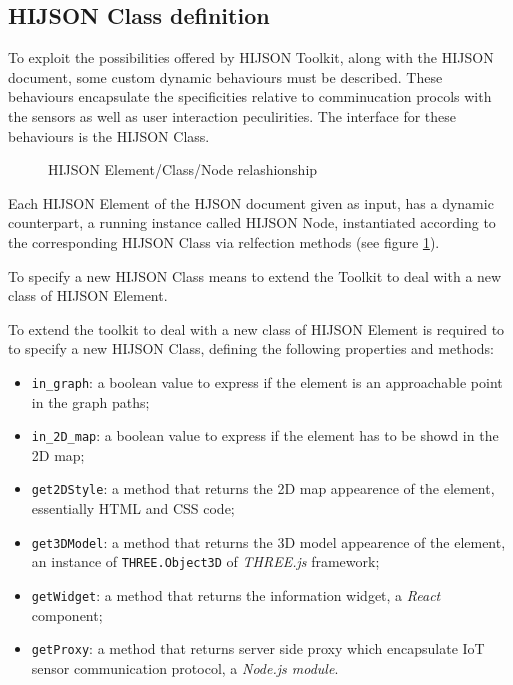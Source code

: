 \subsection{HIJSON Class definition}\label{hijson-class-definition}

To exploit the possibilities offered by HIJSON Toolkit, along with the
HIJSON document, some custom dynamic behaviours must be described. These
behaviours encapsulate the specificities relative to comminucation
procols with the sensors as well as user interaction peculirities. The
interface for these behaviours is the HIJSON Class.

\begin{figure}[!h]
\centering
{}
\caption{HIJSON Element/Class/Node relashionship}
\label{fig:elem-class-node-rel}
\end{figure}

Each HIJSON Element of the HJSON document given as input, has a dynamic
counterpart, a running instance called HIJSON Node, instantiated
according to the corresponding HIJSON Class via relfection methods (see
figure \ref{fig:elem-class-node-rel}).

To specify a new HIJSON Class means to extend the Toolkit to deal with a
new class of HIJSON Element.

To extend the toolkit to deal with a new class of HIJSON Element is
required to to specify a new HIJSON Class, defining the following
properties and methods:

\begin{itemize}
\item
 \texttt{in\_graph}: a boolean value to express if the element is an
 approachable point in the graph paths;
\item
 \texttt{in\_2D\_map}: a boolean value to express if the element has 
 to be showd in the 2D map;
\item
 \texttt{get2DStyle}: a method that returns the 2D map appearence of
 the element, essentially HTML and CSS code;
\item
 \texttt{get3DModel}: a method that returns the 3D model appearence of
 the element, an instance of {\tt THREE.Object3D} of \emph{THREE.js} 
 framework;
\item
 \texttt{getWidget}: a method that returns the information widget, a
 \emph{React} component;
\item
 \texttt{getProxy}: a method that returns server side proxy which
 encapsulate IoT sensor communication protocol, a \emph{Node.js
 module}.
\end{itemize}

